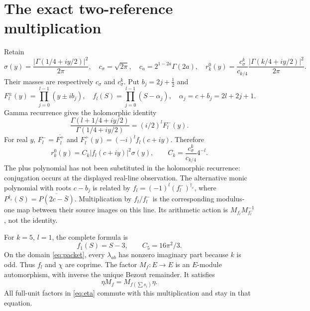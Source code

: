 \documentclass[11pt,a4paper]{article}
\begin{document}
\section{The exact two-reference multiplication}\label{sec:gamma}
Retain
\begin{equation}
 \sigma(y)=\frac{|\Gamma(1/4+iy/2)|^2}{2\pi},\quad c_\sigma=\sqrt{2\pi},\quad
 c_a=2^{1-2a}\Gamma(2a),\quad
 r_k^0(y)=\frac{c_\sigma^k}{c_{k/4}}\frac{|\Gamma(k/4+iy/2)|^2}{2\pi}.
\end{equation}
Their masses are respectively $c_\sigma$ and $c_\sigma^k$.
Put $b_j=2j+\tfrac12$ and
\begin{equation}
 F_l^\pm(y)=\prod_{j=0}^{l-1}(y\pm ib_j),\quad
 f_l(S)=\prod_{j=0}^{l-1}(S-\alpha_j),\quad
 \alpha_j=c+b_j=2l+2j+1.
\end{equation}
Gamma recurrence gives the holomorphic identity
\begin{equation}
 \frac{\Gamma(l+1/4+iy/2)}{\Gamma(1/4+iy/2)}
 =(i/2)^l F_l^-(y).
\end{equation}
For real $y$, $F_l^- =\overline{F_l^+}$ and $F_l^+(y)=(-i)^lf_l(c+iy)$. Therefore
\begin{equation}
 \boxed{r_k^0(y)=C_k|f_l(c+iy)|^2\sigma(y),\qquad
 C_k=\frac{c_\sigma^k}{c_{k/4}}4^{-l}.}
 \label{eq:gamma}
\end{equation}
The plus polynomial has not been substituted in the holomorphic recurrence: conjugation occurs at the displayed real-line observation. The alternative monic polynomial with roots $c-b_j$ is related by $f_l=(-1)^l(f_l^-)^{\dagger_c}$, where $P^{\dagger_c}(S)=\overline{P(2c-\bar S)}$. Multiplication by $f_l/f_l^-$ is the corresponding modulus-one map between their source images on this line. Its arithmetic action is $M_{f_l}M_{f_l^-}^{-1}$, not the identity.

For $k=5$, $l=1$, the complete formula is
\begin{equation}
 f_1(S)=S-3,\qquad C_5=16\pi^2/3.
\end{equation}
On the domain \eqref{eq:packet}, every $\lambda_{ab}$ has nonzero imaginary part because $k$ is odd. Thus $f_l$ and $\chi$ are coprime. The factor $M_f:E\to E$ is an $E$-module automorphism, with inverse the unique Bezout remainder. It satisfies
\begin{equation}
 \eta M_f=M_{f(\sum s_i)}\eta.
\end{equation}
All full-unit factors in \eqref{eq:eta} commute with this multiplication and stay in that equation.
\end{document}
